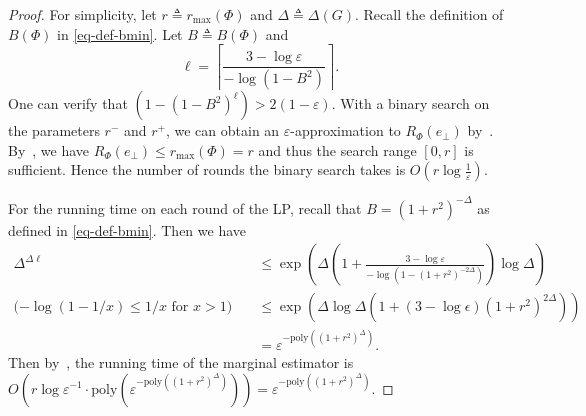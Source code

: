 \documentclass[11pt]{article}
\def\poly{\mathrm{poly}}
\newcommand{\zdnew}[1]{{\color{cyan} #1}}
\begin{document}
\begin{proof}
    For simplicity, let $r \triangleq r_{\max}(\Phi)$ and $\Delta \triangleq \Delta(G)$. Recall the definition of $B(\Phi)$ in \eqref{eq-def-bmin}.
    Let $B \triangleq B(\Phi)$ and 
    $$
        \ell = \left\lceil \frac{3 - \log{\varepsilon}}{-\log\left(1 - B^2\right)} \right\rceil.
    $$
    One can verify that $\left(1 - \left(1 - B^2\right)^{\ell}\right) > 2(1 - \varepsilon) $.
    With a binary search on the parameters $r^-$ and $r^+$, we can obtain an $\varepsilon$-approximation to $R_\Phi(e_\bot)$ by~. By~, 
    we have 
    $R_{\Phi}(e_\bot)\leq r_{\max}(\Phi) = r$ and thus the search range $[0, r]$ is sufficient. Hence the number of rounds the binary search takes is $O\left(r\log{\frac{1}{\varepsilon}}\right)$.

    For the running time on each round of the LP, recall that $B = (1 + r^2)^{-\Delta}$ as defined in \eqref{eq-def-bmin}. Then we have
    \begin{align*}
        \Delta^{\Delta \ell} &\le \exp\left(\Delta\left(1 + \frac{3 - \log{\varepsilon}}{-\log\left(1 - (1 + r^2)^{-2\Delta}\right)}\right) \log{\Delta}\right) \\
        \mbox{($-\log(1 - 1/x) \le 1/x$ for $x > 1$)} \quad
        &\le \exp\left(\Delta \log{\Delta} \left(1 + (3 - \log{\epsilon}) (1 + r^2)^{2\Delta}\right)\right) \\
        &= \varepsilon^{-\poly((1 + r^2)^\Delta)}.
    \end{align*}
    \zdnew{Then by~, the running time of the marginal estimator is $O\left(r\log{\varepsilon^{-1}} \cdot \poly\left(\varepsilon^{-\poly\left((1 + r^2)^\Delta\right)}\right)\right) = \varepsilon^{-\poly\left((1 + r^2)^\Delta\right)}$.}
\end{proof}
\end{document}
